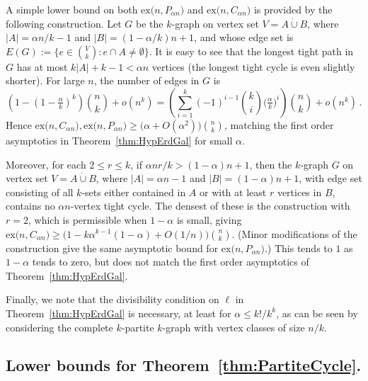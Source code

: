 \documentclass[12pt,a4paper]{amsart}
\def\dcup{\mathbin{\dot{\cup}}}
\newcommand{\ex}{\mathrm{ex}}
\begin{document}
A simple lower bound on both $\ex\big(n,P_{\alpha n}\big)$ and $\ex\big(n,C_{\alpha n}\big)$ is provided by the following construction. Let $G$
be the $k$-graph on vertex set $V=A\dcup B$, where $|A|=\alpha
n/k-1$ and $|B|=(1-\alpha /k)n+1$, and whose edge set is $E(G):=\{e\in
\binom{V}{k}:e\cap A\neq \emptyset\}$. It is easy to see that the longest tight
path in $G$ has at most $k|A|+k-1< \alpha n$ vertices (the longest tight cycle is even slightly shorter). For large $n$,
the number of edges in $G$ is 
\[ \left(1-(1-\tfrac{\alpha}{k})^k\right)\binom{n}{k} +
o(n^k) = \left(\sum_{i=1}^k (-1)^{i-1}
\binom{k}{i}\big(\tfrac{\alpha}{k}\big)^i\right) \binom{n}{k} + o(n^k)\,.\]
Hence $\ex\big(n,C_{\alpha n}\big),\ex\big(n,P_{\alpha n}\big)\ge\big(\alpha+O(\alpha^2)\big)\binom{n}{k}$, matching the first order asymptotics in Theorem~\ref{thm:HypErdGal} for small $\alpha$.

Moreover, for each $2\le r\le k$, if $\alpha n r/k >(1-\alpha)n+1$, then the $k$-graph $G$ on
vertex set $V=A\dcup B$, where $|A|=\alpha n-1$ and $|B|=(1-\alpha)n+1$, with edge set consisting of all $k$-sets either
contained in $A$ or with at least $r$ vertices in $B$, contains no $\alpha
n$-vertex tight cycle. The densest of these is the construction with $r=2$, which is permissible when $1-\alpha$ is small, giving $\ex\big(n,C_{\alpha n}\big)\ge\big(1-k\alpha^{k-1}(1-\alpha)+O(1/n)\big)\binom{n}{k}$. (Minor modifications of the construction give the same asymptotic bound for $\ex\big(n,P_{\alpha n}\big)$.) This tends to $1$ as $1-\alpha$ tends to zero, but does not match the first order asymptotics of Theorem~\ref{thm:HypErdGal}.

Finally, we note that the divisibility condition on $\ell$ in Theorem~\ref{thm:HypErdGal} is necessary, at least for
$\alpha \leq k!/k^k$, as can be seen by considering the complete $k$-partite $k$-graph with vertex classes of size $n/k$.

\subsection{Lower bounds for Theorem~\ref{thm:PartiteCycle}.}
\end{document}
